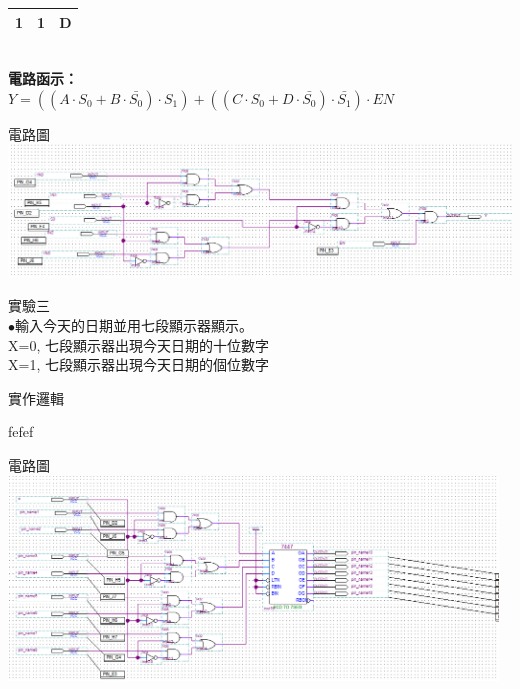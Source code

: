 \documentclass[12pt, a4paper]{article}
\begin{document}
\begin{description}
\begin{description}
\begin{description}
\begin{samepage}
\begin{table}[h]
\begin{adjustbox}{width=.3\textwidth}
\begin{tabular}{ |c c|c| }
                          1 & 1 & D \\
                          \hline
                        \end{tabular}
                      \end{adjustbox}
                    \end{table}\\
                      \bf 電路函示：\\
                      $Y = ((A\cdot S_{0} + B\cdot \bar{S_{0}})\cdot S_{1}) + ((C\cdot S_{0} + D\cdot \bar{S_{0}})\cdot \bar{S_{1}})\cdot EN$
                  \end{samepage}
                \fontsize{18pt}{20pt}
                \item[(2)] 電路圖 \\[.3cm]
                  \includegraphics[width=15cm]{./image/ex2.png} \\[.3cm]
              \end{description}
        \fontsize{20pt}{22pt}\selectfont
        \item[3.] 實驗三 \\
            \fontsize{16pt}{18pt}\selectfont
            $\bullet$輸入今天的日期並用七段顯示器顯示。 \\
            X=0, 七段顯示器出現今天日期的十位數字\\
            X=1, 七段顯示器出現今天日期的個位數字
            \normalsize
            \begin{description}
              \fontsize{18pt}{20pt}\selectfont
              \item[(1)]實作邏輯 \\
                \begin{samepage}
                  \fontsize{16pt}{18pt}\selectfont
                  fefef
                  \normalsize
                \end{samepage}
              \fontsize{18pt}{20pt}\selectfont
              \item[(2)]電路圖 \\[.2cm] 
              \includegraphics[width=13cm]{./image/ex3.png}

\end{description}
\end{description}
\end{description}
\end{document}
